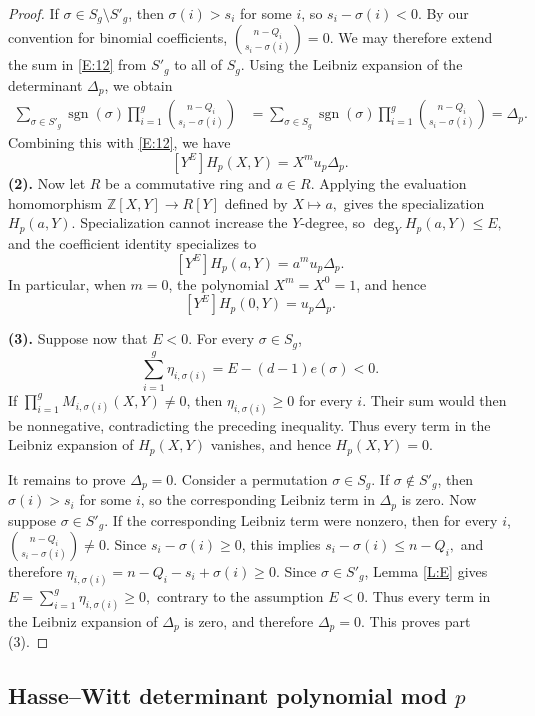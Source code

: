 \documentclass{amsart}
\theoremstyle{plain}
\theoremstyle{remark}
\theoremstyle{remark}
\newcommand{\0}{\mathbf{0}}
\newcommand{\1}{\mathbf{1}}
\newcommand{\Z}{\mathbb{Z}}
\begin{document}
\begin{proof}
If $\sigma\in S_g\setminus S'_g$, then $\sigma(i)>s_i$ for some $i$, so
$
s_i-\sigma(i)<0.
$
By our convention for binomial coefficients,
$
\binom{n-Q_i}{s_i-\sigma(i)}=0.
$
We may therefore extend the sum in \eqref{E:12} from $S'_g$ to all of $S_g$. Using the Leibniz expansion of the determinant $\Delta_p$, we obtain
$$
\begin{aligned}
\sum_{\sigma\in S'_g}
\operatorname{sgn}(\sigma)
\prod_{i=1}^{g}
\binom{n-Q_i}{s_i-\sigma(i)}
&=
\sum_{\sigma\in S_g}
\operatorname{sgn}(\sigma)
\prod_{i=1}^{g}
\binom{n-Q_i}{s_i-\sigma(i)}=
\Delta_p.
\end{aligned}
$$
Combining this with \eqref{E:12}, we have 
$$
[Y^E]H_p(X,Y)=X^m u_p\Delta_p.
$$
{\bf (2).} Now let $R$ be a commutative ring and $a\in R$.
Applying the evaluation homomorphism  
$
\Z[X,Y]\longrightarrow R[Y]$ defined by
$X\longmapsto a,$
gives the specialization $H_p(a,Y)$.
Specialization cannot increase the $Y$-degree, so
$
\deg_Y H_p(a,Y)\leq E,
$
and the coefficient identity specializes to
$$
[Y^E]H_p(a,Y)=a^m u_p\Delta_p.
$$
In particular, when $m=0$, the polynomial $X^m=X^0=1$, 
and hence 
$$[Y^E]H_p(0,Y)=u_p\Delta_p.$$

\noindent 
{\bf (3).} Suppose now that $E<0$. For every $\sigma\in S_g$, 
$$
\sum_{i=1}^{g}\eta_{i,\sigma(i)}
=E-(d-1)e(\sigma)<0.
$$
If $\prod_{i=1}^g M_{i,\sigma(i)}(X,Y)\ne 0$, then 
$\eta_{i,\sigma(i)}\geq0$ for every $i$. 
Their sum would then be nonnegative, contradicting the preceding inequality. Thus every term in the Leibniz expansion of $H_p(X,Y)$ vanishes, and hence
$
H_p(X,Y)=0.
$

It remains to prove $\Delta_p=0$.
Consider a permutation $\sigma\in S_g$.
If $\sigma\not\in S'_g$, then 
$\sigma(i)>s_i$ for some $i$, so the corresponding Leibniz term 
in $\Delta_p$ is zero.
Now suppose $\sigma\in S'_g$.
If the corresponding Leibniz term were nonzero, then for every $i$, 
$\binom{n-Q_i}{s_i-\sigma(i)}\ne 0$.
Since $s_i-\sigma(i)\ge 0$, this implies 
$s_i-\sigma(i)\le n-Q_i,$
and therefore
$\eta_{i,\sigma(i)}=n-Q_i-s_i+\sigma(i)\ge 0.$
Since $\sigma\in S'_g$, Lemma \ref{L:E} gives 
$
E=\sum_{i=1}^{g}\eta_{i,\sigma(i)}\geq0,
$
contrary to the assumption $E<0$. Thus every term in the Leibniz
expansion of $\Delta_p$ is zero, and therefore
$
\Delta_p=0.
$
This proves part (3).
\end{proof}






\subsection{Hasse--Witt determinant polynomial mod $p$}
  
\end{document}
